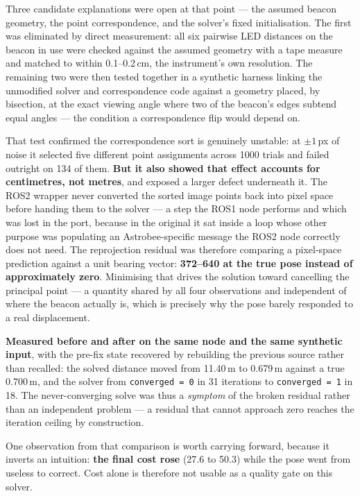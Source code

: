 \documentclass[11pt]{article}
\begin{document}
Three candidate explanations were open at that point --- the assumed beacon
geometry, the point correspondence, and the solver's fixed initialisation.
The first was eliminated by direct measurement: all six pairwise LED
distances on the beacon in use were checked against the assumed geometry
with a tape measure and matched to within 0.1--0.2\,cm, the instrument's own
resolution. The remaining two were then tested together in a synthetic
harness linking the unmodified solver and correspondence code against a
geometry placed, by bisection, at the exact viewing angle where two of the
beacon's edges subtend equal angles --- the condition a correspondence flip
would depend on.

That test confirmed the correspondence sort is genuinely unstable: at
$\pm1$\,px of noise it selected five different point assignments across 1000
trials and failed outright on 134 of them. \textbf{But it also showed that
effect accounts for centimetres, not metres}, and exposed a larger defect
underneath it. The ROS2 wrapper never converted the sorted image points back
into pixel space before handing them to the solver --- a step the ROS1 node
performs and which was lost in the port, because in the original it sat
inside a loop whose other purpose was populating an Astrobee-specific
message the ROS2 node correctly does not need. The reprojection residual was
therefore comparing a pixel-space prediction against a unit bearing vector:
\textbf{372--640 at the true pose instead of approximately zero}. Minimising
that drives the solution toward cancelling the principal point --- a
quantity shared by all four observations and independent of where the beacon
actually is, which is precisely why the pose barely responded to a real
displacement.

\textbf{Measured before and after on the same node and the same synthetic
input}, with the pre-fix state recovered by rebuilding the previous source
rather than recalled: the solved distance moved from 11.40\,m to 0.679\,m
against a true 0.700\,m, and the solver from \texttt{converged = 0} in 31
iterations to \texttt{converged = 1} in 18. The never-converging solve was
thus a \emph{symptom} of the broken residual rather than an independent
problem --- a residual that cannot approach zero reaches the iteration
ceiling by construction.

One observation from that comparison is worth carrying forward, because it
inverts an intuition: \textbf{the final cost rose} (27.6 to 50.3) while the
pose went from useless to correct. Cost alone is therefore not usable as a
quality gate on this solver.
\end{document}
